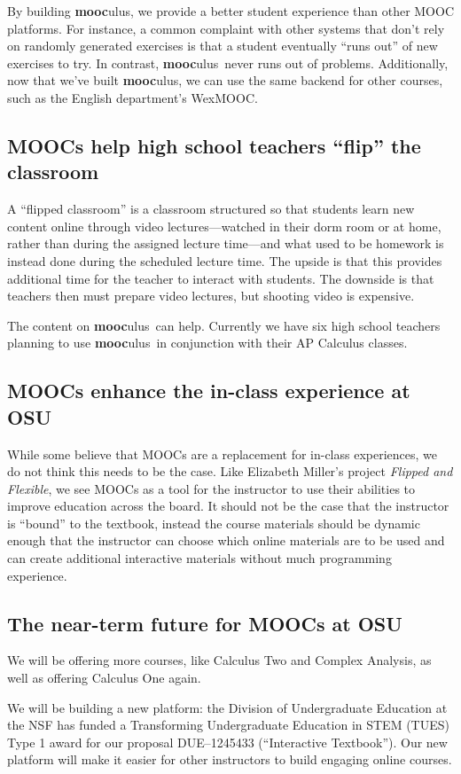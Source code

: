 \documentclass[12pt]{amsart}
\newcommand{\mooculus}{\textsf{\textbf{mooc}ulus}}
\begin{document}
By building \mooculus, we provide a better student experience than
other MOOC platforms.  For instance, a common complaint with other
systems that don't rely on randomly generated exercises is that a
student eventually ``runs out'' of new exercises to try.  In contrast,
\mooculus\ never runs out of problems.  Additionally, now that we've
built \mooculus, we can use the same backend for other courses, such
as the English department's WexMOOC.

\subsection*{MOOCs help high school teachers ``flip'' the classroom}

A ``flipped classroom'' is a classroom structured so that students
learn new content online through video lectures---watched in their
dorm room or at home, rather than during the assigned lecture
time---and what used to be homework is instead done during the scheduled lecture time. The upside is
that this provides additional time for the teacher to interact with
students.  The downside is that teachers then must prepare video
lectures, but shooting video is expensive.

The content on \mooculus\ can help.  Currently we have six high school
teachers planning to use \mooculus\ in conjunction with their AP
Calculus classes.

\subsection*{MOOCs enhance the in-class experience at OSU}

While some believe that MOOCs are a replacement for in-class experiences, we do
not think this needs to be the case. Like Elizabeth Miller's project
\textit{Flipped and Flexible}, we see MOOCs as a tool for the
instructor to use their abilities to improve education across the
board. It should not be the case that the instructor is ``bound'' to
the textbook, instead the course materials should be dynamic enough
that the instructor can choose which online materials are to be used
and can create additional interactive materials without much programming experience.

\subsection*{The near-term future for MOOCs at OSU}

We will be offering more courses, like Calculus Two and Complex
Analysis, as well as offering Calculus One again.

We will be building a new platform: the Division of Undergraduate
Education at the NSF has funded a Transforming Undergraduate Education
in STEM (TUES) Type 1 award for our proposal DUE--1245433
(``Interactive Textbook'').  Our new platform will make it easier for
other instructors to build engaging online courses.
\end{document}
